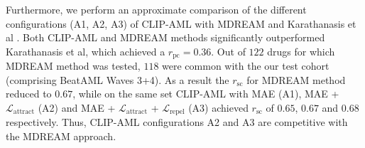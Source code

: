 \documentclass[sigconf,authordraft]{acmart}
\begin{document}
Furthermore, we perform an approximate comparison of the different configurations (A1, A2, A3) of CLIP-AML with MDREAM \cite{radford2021learning} and Karathanasis et al \cite{karathanasis2024machine}. Both CLIP-AML and MDREAM methods significantly outperformed Karathanasis et al, which achieved a $r_{\text{pc}}=0.36$. Out of $122$ drugs for which MDREAM method was tested, $118$ were common with the our test cohort (comprising BeatAML Waves 3+4). As a result the $r_{\text{sc}}$ for MDREAM method reduced to $0.67$, while on the same set CLIP-AML with MAE (A1), MAE + $\mathcal{L}_{\text{attract}}$ (A2) and MAE + $\mathcal{L}_{\text{attract}}$ + $\mathcal{L}_{\text{repel}}$ (A3) achieved $r_{\text{sc}}$ of $0.65$, $0.67$ and $0.68$ respectively. Thus, CLIP-AML configurations A2 and A3 are competitive with the MDREAM approach.

\end{document}
